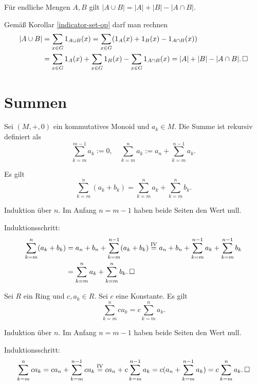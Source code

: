\begin{Satz}
Für endliche Mengen $A,B$ gilt $|A\cup B| = |A|+|B|-|A\cap B|$.
\end{Satz}
\begin{Beweis}
Gemäß Korollar \ref{indicator-set-op} darf man rechnen
\begin{align*}
|A\cup B| &= \sum_{x\in G} 1_{A\cup B}(x)
= \sum_{x\in G} (1_A(x) + 1_B(x) - 1_{A\cap B}(x))\\
&= \sum_{x\in G} 1_A(x) + \sum_{x\in G} 1_B(x) - \sum_{x\in G} 1_{A\cap B}(x)
= |A| + |B| - |A\cap B|.\,\square
\end{align*}
\end{Beweis}

\newpage
\section{Summen}

\begin{Definition}[Summe]
Sei $(M,+,0)$ ein kommutatives Monoid und $a_k\in M$. Die Summe ist
rekursiv definiert als
\[\sum_{k=m}^{m-1} a_k := 0,\quad \sum_{k=m}^n a_k
:= a_n + \sum_{k=m}^{n-1} a_k.\]
\end{Definition}

\begin{Korollar}\label{sum-add}
Es gilt
\[\sum_{k=m}^n (a_k + b_k) = \sum_{k=m}^n a_k + \sum_{k=m}^n b_k.\]
\end{Korollar}
\begin{Beweis} Induktion über $n$. Im Anfang $n=m-1$ haben
beide Seiten den Wert null.

Induktionsschritt:
\begin{align*}
\sum_{k=m}^n (a_k+b_k) &= a_n + b_n + \sum_{k=m}^{n-1} (a_k+b_k)
\stackrel{\mathrm{IV}}= a_n + b_n + \sum_{k=m}^{n-1} a_k + \sum_{k=m}^{n-1} b_k\\
&= \sum_{k=m}^n a_k + \sum_{k=m}^n b_k.\,\square
\end{align*}
\end{Beweis}

\begin{Korollar}\label{sum-scale}
Sei $R$ ein Ring und $c,a_k\in R$. Sei $c$ eine
Konstante. Es gilt
\[\sum_{k=m}^n ca_k = c\sum_{k=m}^n a_k.\]
\end{Korollar}
\begin{Beweis} Induktion über $n$. Im Anfang $n=m-1$ haben beide
Seiten den Wert null.

Induktionsschritt:
\[\sum_{k=m}^n ca_k = ca_n + \sum_{k=m}^{n-1} ca_k
\stackrel{\mathrm{IV}}= ca_n + c\sum_{k=m}^{n-1} a_k
= c(a_n + \sum_{k=m}^{n-1} a_k) = c\sum_{k=m}^n a_k.\,\square\]
\end{Beweis}

